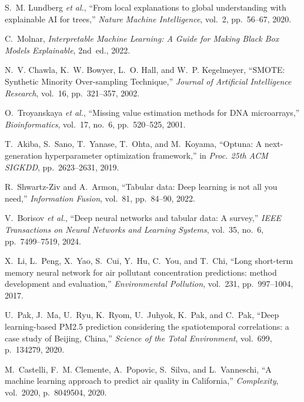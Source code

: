 \documentclass[12pt,a4paper]{report}
\begin{document}
\begin{enumerate}[leftmargin=1.5cm, label={[\arabic*]}]
\item S.~M. Lundberg \textit{et al.}, ``From local explanations to global understanding with explainable AI for trees,'' \textit{Nature Machine Intelligence}, vol.~2, pp.~56--67, 2020.

\item C.~Molnar, \textit{Interpretable Machine Learning: A Guide for Making Black Box Models Explainable}, 2nd~ed., 2022.

\item N.~V. Chawla, K.~W. Bowyer, L.~O. Hall, and W.~P. Kegelmeyer, ``SMOTE: Synthetic Minority Over-sampling Technique,'' \textit{Journal of Artificial Intelligence Research}, vol.~16, pp.~321--357, 2002.

\item O.~Troyanskaya \textit{et al.}, ``Missing value estimation methods for DNA microarrays,'' \textit{Bioinformatics}, vol.~17, no.~6, pp.~520--525, 2001.

\item T.~Akiba, S.~Sano, T.~Yanase, T.~Ohta, and M.~Koyama, ``Optuna: A next-generation hyperparameter optimization framework,'' in \textit{Proc. 25th ACM SIGKDD}, pp.~2623--2631, 2019.

\item R.~Shwartz-Ziv and A.~Armon, ``Tabular data: Deep learning is not all you need,'' \textit{Information Fusion}, vol.~81, pp.~84--90, 2022.

\item V.~Borisov \textit{et al.}, ``Deep neural networks and tabular data: A survey,'' \textit{IEEE Transactions on Neural Networks and Learning Systems}, vol.~35, no.~6, pp.~7499--7519, 2024.

\item X.~Li, L.~Peng, X.~Yao, S.~Cui, Y.~Hu, C.~You, and T.~Chi, ``Long short-term memory neural network for air pollutant concentration predictions: method development and evaluation,'' \textit{Environmental Pollution}, vol.~231, pp.~997--1004, 2017.

\item U.~Pak, J.~Ma, U.~Ryu, K.~Ryom, U.~Juhyok, K.~Pak, and C.~Pak, ``Deep learning-based PM2.5 prediction considering the spatiotemporal correlations: a case study of Beijing, China,'' \textit{Science of the Total Environment}, vol.~699, p.~134279, 2020.

\item M.~Castelli, F.~M. Clemente, A.~Popovic, S.~Silva, and L.~Vanneschi, ``A machine learning approach to predict air quality in California,'' \textit{Complexity}, vol.~2020, p.~8049504, 2020.


\end{enumerate}
\end{document}
